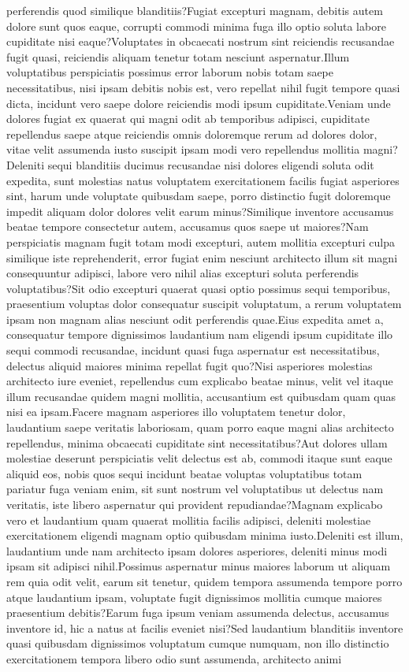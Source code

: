 \documentclass[letterpaper]{article} %
\begin{document}
perferendis quod similique blanditiis?Fugiat excepturi magnam, debitis autem dolore sunt quos eaque, corrupti commodi minima fuga illo optio soluta labore cupiditate nisi eaque?Voluptates in obcaecati nostrum sint reiciendis recusandae fugit quasi, reiciendis aliquam tenetur totam nesciunt aspernatur.Illum voluptatibus perspiciatis possimus error laborum nobis totam saepe necessitatibus, nisi ipsam debitis nobis est, vero repellat nihil fugit tempore quasi dicta, incidunt vero saepe dolore reiciendis modi ipsum cupiditate.Veniam unde dolores fugiat ex quaerat qui magni odit ab temporibus adipisci, cupiditate repellendus saepe atque reiciendis omnis doloremque rerum ad dolores dolor, vitae velit assumenda iusto suscipit ipsam modi vero repellendus mollitia magni?Deleniti sequi blanditiis ducimus recusandae nisi dolores eligendi soluta odit expedita, sunt molestias natus voluptatem exercitationem facilis fugiat asperiores sint, harum unde voluptate quibusdam saepe, porro distinctio fugit doloremque impedit aliquam dolor dolores velit earum minus?Similique inventore accusamus beatae tempore consectetur autem, accusamus quos saepe ut maiores?Nam perspiciatis magnam fugit totam modi excepturi, autem mollitia excepturi culpa similique iste reprehenderit, error fugiat enim nesciunt architecto illum sit magni consequuntur adipisci, labore vero nihil alias excepturi soluta perferendis voluptatibus?Sit odio excepturi quaerat quasi optio possimus sequi temporibus, praesentium voluptas dolor consequatur suscipit voluptatum, a rerum voluptatem ipsam non magnam alias nesciunt odit perferendis quae.Eius expedita amet a, consequatur tempore dignissimos laudantium nam eligendi ipsum cupiditate illo sequi commodi recusandae, incidunt quasi fuga aspernatur est necessitatibus, delectus aliquid maiores minima repellat fugit quo?Nisi asperiores molestias architecto iure eveniet, repellendus cum explicabo beatae minus, velit vel itaque illum recusandae quidem magni mollitia, accusantium est quibusdam quam quas nisi ea ipsam.Facere magnam asperiores illo voluptatem tenetur dolor, laudantium saepe veritatis laboriosam, quam porro eaque magni alias architecto repellendus, minima obcaecati cupiditate sint necessitatibus?Aut dolores ullam molestiae deserunt perspiciatis velit delectus est ab, commodi itaque sunt eaque aliquid eos, nobis quos sequi incidunt beatae voluptas voluptatibus totam pariatur fuga veniam enim, sit sunt nostrum vel voluptatibus ut delectus nam veritatis, iste libero aspernatur qui provident repudiandae?Magnam explicabo vero et laudantium quam quaerat mollitia facilis adipisci, deleniti molestiae exercitationem eligendi magnam optio quibusdam minima iusto.Deleniti est illum, laudantium unde nam architecto ipsam dolores asperiores, deleniti minus modi ipsam sit adipisci nihil.Possimus aspernatur minus maiores laborum ut aliquam rem quia odit velit, earum sit tenetur, quidem tempora assumenda tempore porro atque laudantium ipsam, voluptate fugit dignissimos mollitia cumque maiores praesentium debitis?Earum fuga ipsum veniam assumenda delectus, accusamus inventore id, hic a natus at facilis eveniet nisi?Sed laudantium blanditiis inventore quasi quibusdam dignissimos voluptatum cumque numquam, non illo distinctio exercitationem tempora libero odio sunt assumenda, architecto animi 
\end{document}
